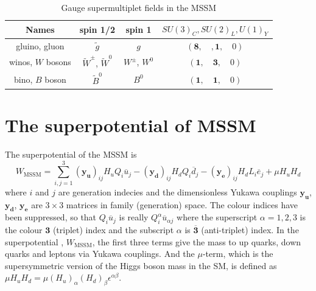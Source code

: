 \documentclass[12pt]{report}
\begin{document}
\begin{table}[htdp]
\begin{center}
{\renewcommand{\arraystretch}{1.5}%
\begin{tabular}{|c|c|c|c|}
\hline
Names & spin 1/2 & spin 1 & $SU(3)_{C}, SU(2)_{L}, U(1)_{Y}$\\ 
\hline
\hline
gluino, gluon & $\widetilde{g}$ & $g$ & $(\mathbf{8}, \quad, \mathbf{1}, \quad 0)$\\
\hline
winos, $W$ bosons & $\widetilde{W}^{\pm}$, $\widetilde{W}^{0}$ & $W^{\pm}$, $W^{0}$ & $(\mathbf{1}, \quad \mathbf{3}, \quad 0)$\\
\hline
bino, $B$ boson & $\widetilde{B}^{0}$ & $B^{0}$ & $(\mathbf{1}, \quad \mathbf{1}, \quad 0)$\\
\hline
\end{tabular}
} %
\end{center}
\caption{Gauge supermultiplet fields in the MSSM}
\label{table: gauge supermultiplets in the MSSM}
\end{table}%



\section{The superpotential of MSSM}
The superpotential of the MSSM is
\begin{equation} \label{eq: superpotential in MSSM}
W_{\mathrm{MSSM}} = \sum^{3}_{i, j = 1} (\mathbf{y_{u}})_{ij} H_{u} Q_{i} \overline{u}_{j} - (\mathbf{y_{d}})_{ij} H_{d} Q_{i} \overline{d}_{j} - (\mathbf{y_{e}})_{ij} H_{d} L_{i} \overline{e}_{j} +  \mu H_{u} H_{d}
\end{equation}
where $i$ and $j$ are generation indecies and the dimensionless Yukawa couplings $\mathbf{y_{u}}$, $\mathbf{y_{d}}$, $\mathbf{y_{e}}$ are $3 \times 3$ matrices in family (generation) space.
The colour indices have been suppressed, so that $Q_{i} \overline{u}_{j}$ is really $Q^{\alpha}_{i} \overline{u}_{\alpha j}$ where the superscript $\alpha = 1, 2, 3$ is the colour $\mathbf{3}$ (triplet) index and the subscript $\alpha$ is $\overline{\mathbf{3}}$ (anti-triplet) index.
In the superpotential , $W_{\mathrm{MSSM}}$, the first three terms give the mass to up quarks, down quarks and leptons via Yukawa couplings.
And the $\mu$-term, which is the supersymmetric version of the Higgs boson mass in the SM, is defined as $\mu H_{u} H_{d} = \mu (H_{u})_{\alpha} (H_{d})_{\beta} \epsilon^{\alpha \beta}$.
\end{document}
